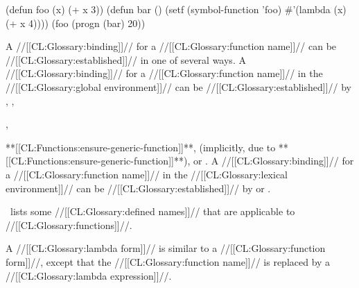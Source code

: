\code
 (defun foo (x) (+ x 3))
 (defun bar () (setf (symbol-function 'foo) #'(lambda (x) (+ x 4))))
 (foo (progn (bar) 20))
\endcode


A //[[CL:Glossary:binding]]// for a //[[CL:Glossary:function name]]// can be //[[CL:Glossary:established]]// in 
one of several ways.  A //[[CL:Glossary:binding]]// for a //[[CL:Glossary:function name]]// in 
the //[[CL:Glossary:global environment]]// can be //[[CL:Glossary:established]]// by 
 ,
 ,

 ,



 **[[CL:Functions:ensure-generic-function]]**,
  (implicitly, due to **[[CL:Functions:ensure-generic-function]]**),
or
 .
A //[[CL:Glossary:binding]]// for a //[[CL:Glossary:function name]]// in the //[[CL:Glossary:lexical environment]]//
can be //[[CL:Glossary:established]]// by
or .
























\Thenextfigure\ lists some //[[CL:Glossary:defined names]]// that are applicable to //[[CL:Glossary:functions]]//.











\endsubsubsubsubsection%


A //[[CL:Glossary:lambda form]]// is similar to a //[[CL:Glossary:function form]]//, except that
the //[[CL:Glossary:function name]]// is replaced by a //[[CL:Glossary:lambda expression]]//.

